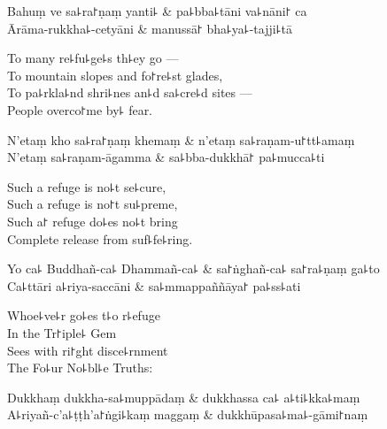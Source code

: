 \begin{twochants}
  Bahuṃ ve sa꜕ra꜓ṇaṃ yanti꜕ & pa꜕bba꜕tāni va꜕nāni꜓ ca \\
  Ārāma-rukkha꜕-cetyāni & manussā꜓ bha꜕ya꜕-tajji꜕tā \\
\end{twochants}

\begin{english}
  To many re꜕fu꜕ge꜕s th꜕ey go ---\\
  To mountain slopes and fo꜓re꜕st glades,\\
  To pa꜕rkla꜕nd shri꜕nes an꜕d sa꜕cre꜕d sites ---\\
  People overco꜓me by꜕ fear.
\end{english}


\begin{twochants}
  N'etaṃ kho sa꜕ra꜓ṇaṃ khemaṃ & n'etaṃ sa꜕raṇam-u꜓tt꜕amaṃ \\
  N'etaṃ sa꜕raṇam-āgamma & sa꜕bba-dukkhā꜓ pa꜕mucca꜕ti \\
\end{twochants}

\begin{english}
  Such a refuge is no꜕t se꜕cure,\\
  Such a refuge is no꜓t su꜕preme,\\
  Such a꜓ refuge do꜕es no꜕t bring\\
  Complete release from suf꜕fe꜕ring.
\end{english}

\begin{twochants}
  Yo ca꜕ Buddhañ-ca꜕ Dhammañ-ca꜕ & sa꜓ṅghañ-ca꜕ sa꜓ra꜕ṇaṃ ga꜕to \\
  Ca꜕ttāri a꜕riya-saccāni & sa꜕mmappaññāya꜓ pa꜕ss꜕ati \\
\end{twochants}

\begin{english}
  Whoe꜕ve꜕r go꜕es t꜕o r꜕efuge\\
  In the Tr꜓iple꜕ Gem\\
  Sees with ri꜓ght disce꜕rnment\\
  The Fo꜕ur No꜕bl꜕e Truths:
\end{english}

\begin{twochants}
  Dukkhaṃ dukkha-sa꜕muppādaṃ & dukkhassa ca꜕ a꜕ti꜕kka꜕maṃ \\
  A꜕riyañ-c'a꜕ṭṭh'a꜓ṅgi꜕kaṃ maggaṃ & dukkhūpasa꜕ma꜕-gāmi꜓naṃ \\
\end{twochants}

